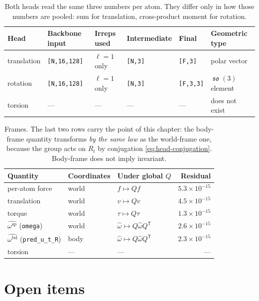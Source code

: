 \documentclass[11pt,a4paper]{report}
\theoremstyle{definition}
\theoremstyle{remark}
\DeclareMathOperator{\so}{\mathfrak{so}}
\newcommand{\shape}[1]{\texttt{[#1]}}
\begin{document}
\begin{table}[htbp]
\centering
\begin{tabular}{llllll}
\toprule
Head & Backbone input & Irreps used & Intermediate & Final & Geometric type \\
\midrule
translation & \shape{N,16,128} & $\ell=1$ only & \shape{N,3} & \shape{F,3} & polar vector \\
rotation & \shape{N,16,128} & $\ell=1$ only & \shape{N,3} & \shape{F,3,3} & $\so(3)$ element \\
torsion & --- & --- & --- & --- & does not exist \\
\bottomrule
\end{tabular}
\caption{Both heads read the same three numbers per atom. They differ only in
how those numbers are pooled: sum for translation, cross-product moment for
rotation.}
\label{tab:head-shapes}
\end{table}

\begin{table}[htbp]
\centering
\begin{tabular}{lllr}
\toprule
Quantity & Coordinates & Under global $Q$ & Residual \\
\midrule
per-atom force & world & $f\mapsto Qf$ & $5.3\times10^{-15}$ \\
translation & world & $v\mapsto Qv$ & $4.5\times10^{-15}$ \\
torque & world & $\tau\mapsto Q\tau$ & $1.3\times10^{-15}$ \\
$\widehat{\omega^{\mathrm{sp}}}$ (\texttt{omega}) & world & $\widehat\omega\mapsto Q\widehat\omega Q^{\mathsf T}$ & $2.6\times10^{-15}$ \\
$\widehat{\omega^{\mathrm{bd}}}$ (\texttt{pred\_u\_t\_R}) & body & $\widehat\omega\mapsto Q\widehat\omega Q^{\mathsf T}$ & $2.3\times10^{-15}$ \\
torsion & --- & --- & --- \\
\bottomrule
\end{tabular}
\caption{Frames. The last two rows carry the point of this chapter: the
body-frame quantity transforms \emph{by the same law} as the world-frame one,
because the group acts on $R_t$ by conjugation
\eqref{eq:head-conjugation}. Body-frame does not imply invariant.}
\label{tab:head-frames}
\end{table}

\section{Open items}
\label{sec:head-open}
\end{document}
